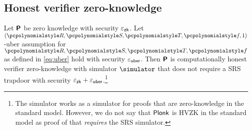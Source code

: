 \documentclass[runningheads,10pt]{llncs}
\begin{document}
\subsection{Honest verifier zero-knowledge}
\begin{lemma}
  Let $\bm{\mathsf{P}}$ be zero knowledge with security $\varepsilon_{\mathsf{zk}}$. Let
  $(\pR, \pS, \pT, \pf, 1)$-uber assumption for $\pR, \pS, \pT, \pf$ as defined
  in \cref{eq:uber} hold with security $\varepsilon_{\mathsf{uber}}$. Then $\bm{\mathsf{P}}$ is
  computationally honest verifier zero-knowledge with simulator $\simulator$
  that does not require a SRS trapdoor with security
  $\varepsilon_{\mathsf{zk}} + \varepsilon_{\mathsf{uber}}$.\footnote{The simulator works as a simulator for proofs
    that are zero-knowledge in the standard model. However, we do not say that
    $\textnormal{\textsf{Plonk}}$ is HVZK in the standard model as proof of that \emph{requires} the
    SRS simulator.}
\end{lemma}
\end{document}
